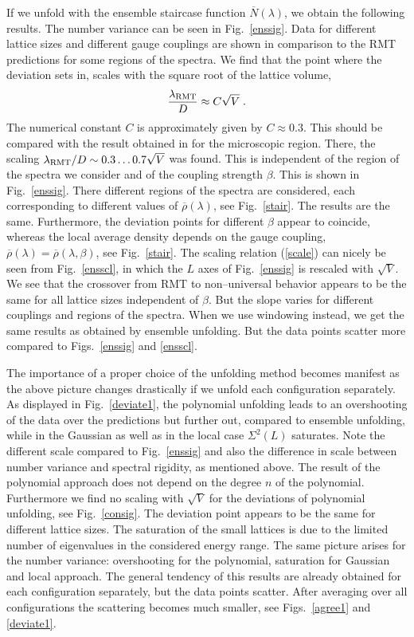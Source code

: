 If we unfold with the ensemble staircase function
$\overline{N}(\lambda)$, we obtain the following results.  The number
variance can be seen in Fig.~\ref{enssig}.  Data for different lattice
sizes and different gauge couplings are shown in comparison to the RMT
predictions for some regions of the spectra. We find that the point
where the deviation sets in, scales with the square root of the
lattice volume,
\begin{equation}
\frac{\lambda_{\rm RMT}}{D}\approx C \sqrt{V}\;.
\label{scale}
\end{equation}
The numerical constant $C$ is approximately given by $C\approx0.3$.
This should be compared with the result obtained in \cite{bitsch98}
for the microscopic region. There, the scaling $\lambda_{\rm
  RMT}/D\sim0.3\ldots0.7\sqrt{V}$ was found.  This is independent of
the region of the spectra we consider and of the coupling strength
$\beta$.  This is shown in Fig.~\ref{enssig}. There different regions
of the spectra are considered, each corresponding to different values
of $\overline{\rho}(\lambda)$, see Fig.~\ref{stair}.  The results are
the same. Furthermore, the deviation points for different $\beta$
appear to coincide, whereas the local average density depends on the
gauge coupling,
$\overline{\rho}(\lambda)=\overline{\rho}(\lambda,\beta)$, see
Fig.~\ref{stair}. The scaling relation (\ref{scale}) can nicely be seen
from Fig.~\ref{ensscl}, in which the $L$ axes of Fig.~\ref{enssig} is
rescaled with $\sqrt{V}$. We see that the crossover from RMT to
non--universal behavior appears to be the same for all lattice sizes
independent of $\beta$. But the slope varies for different couplings
and regions of the spectra.  When we use windowing instead, we get the
same results as obtained by ensemble unfolding.  But the data points
scatter more compared to Figs.~\ref{enssig} and \ref{ensscl}.

The importance of a proper choice of the unfolding method becomes
manifest as the above picture changes drastically if we unfold each
configuration separately.  As displayed in Fig.~\ref{deviate1}, the
polynomial unfolding leads to an overshooting of the data over the
predictions but further out, compared to ensemble unfolding, while in
the Gaussian as well as in the local case $\Sigma^2(L)$ saturates.
Note the different scale compared to Fig.~\ref{enssig} and also the
difference in scale between number variance and spectral rigidity, as
mentioned above.  The result of the polynomial approach does not
depend on the degree $n$ of the polynomial. Furthermore we find no
scaling with $\sqrt{V}$ for the deviations of polynomial unfolding,
see Fig.~\ref{consig}. The deviation point appears to be the same for
different lattice sizes.  The saturation of the small lattices is due
to the limited number of eigenvalues in the considered energy range.
The same picture arises for the number variance: overshooting for the
polynomial, saturation for Gaussian and local approach.  The general
tendency of this results are already obtained for each configuration
separately, but the data points scatter. After averaging over all
configurations the scattering becomes much smaller, see
Figs.~\ref{agree1} and \ref{deviate1}.

